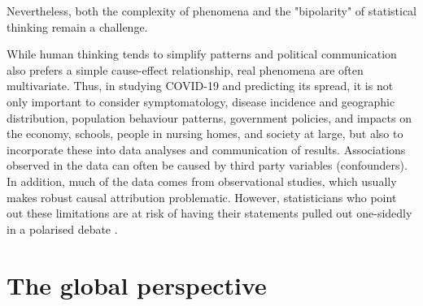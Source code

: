 \documentclass[article]{jdssv}\usepackage[]{graphicx}\usepackage[]{color}
\begin{document}
Nevertheless, both the complexity of phenomena and the "bipolarity" of statistical thinking remain a challenge. 

While human thinking tends to simplify patterns and political communication also prefers a simple cause-effect relationship, real phenomena are often multivariate. Thus, in studying COVID-19 and predicting its spread, it is not only important to consider symptomatology, disease incidence and geographic distribution, population behaviour patterns, government policies, and impacts on the economy, schools, people in nursing homes, and society at large, but also to incorporate these into data analyses and communication of results. Associations observed in the data can often be caused by third party variables (confounders). In addition, much of the data comes from observational studies, which usually makes robust causal attribution problematic. However, statisticians who point out these limitations are at risk of having their statements pulled out one-sidedly in a polarised debate \citep{McConway2021}.

\section[]{The global perspective}
\end{document}

